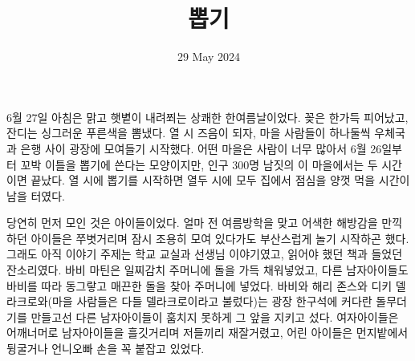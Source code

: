 \documentclass{translation}
\date{29 May 2024}
\title{뽑기}
\begin{document}
6월 27일 아침은 맑고 햇볕이 내려쬐는 상쾌한 한여름날이었다.
꽂은 한가득 피어났고, 잔디는 싱그러운 푸른색을 뽐냈다.
열 시 즈음이 되자, 마을 사람들이 하나둘씩 우체국과 은행 사이 광장에 모여들기 시작했다.
어떤 마을은 사람이 너무 많아서 6월 26일부터 꼬박 이틀을 뽑기에 쓴다는 모양이지만, 인구 300명 남짓의 이 마을에서는 두 시간이면 끝났다.
열 시에 뽑기를 시작하면 열두 시에 모두 집에서 점심을 양껏 먹을 시간이 남을 터였다.
% 

당연히 먼저 모인 것은 아이들이었다.
얼마 전 여름방학을 맞고 어색한 해방감을 만끽하던 아이들은 쭈볏거리며 잠시 조용히 모여 있다가도 부산스럽게 놀기 시작하곤 했다.
그래도 아직 이야기 주제는 학교 교실과 선생님 이야기였고, 읽어야 했던 책과 들었던 잔소리였다.
바비 마틴은 일찌감치 주머니에 돌을 가득 채워넣었고, 다른 남자아이들도 바비를 따라 동그랗고 매끈한 돌을 찾아 주머니에 넣었다.
바비와 해리 존스와 디키 델라크로와(마을 사람들은 다들 델라크로이라고 불렀다)는 광장 한구석에 커다란 돌무더기를 만들고선 다른 남자아이들이 훔치지 못하게 그 앞을 지키고 섰다.
여자아이들은 어깨너머로 남자아이들을 흘깃거리며 저들끼리 재잘거렸고, 어린 아이들은 먼지밭에서 뒹굴거나 언니오빠 손을 꼭 붙잡고 있었다.
% 
\end{document}
